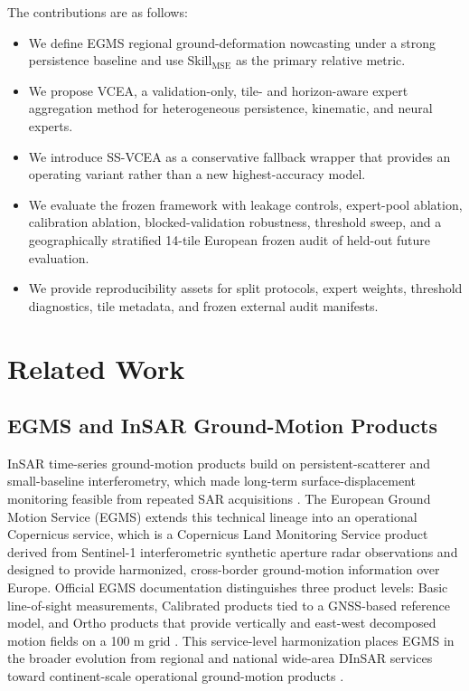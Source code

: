 \documentclass[lettersize,journal]{IEEEtran}
\newcommand{\skillmse}{Skill$_{\mathrm{MSE}}$}
\begin{document}
The contributions are as follows:
\begin{itemize}
  \item We define EGMS regional ground-deformation nowcasting under a strong persistence baseline and use \skillmse{} as the primary relative metric.
  \item We propose VCEA, a validation-only, tile- and horizon-aware expert aggregation method for heterogeneous persistence, kinematic, and neural experts.
  \item We introduce SS-VCEA as a conservative fallback wrapper that provides an operating variant rather than a new highest-accuracy model.
  \item We evaluate the frozen framework with leakage controls, expert-pool ablation, calibration ablation, blocked-validation robustness, threshold sweep, and a geographically stratified 14-tile European frozen audit of held-out future evaluation.
  \item We provide reproducibility assets for split protocols, expert weights, threshold diagnostics, tile metadata, and frozen external audit manifests.
\end{itemize}

\section{Related Work}

\subsection{EGMS and InSAR Ground-Motion Products}

InSAR time-series ground-motion products build on persistent-scatterer and small-baseline interferometry, which made long-term surface-displacement monitoring feasible from repeated SAR acquisitions \cite{Ferretti2001SAR, Berardino2002SAR, Crosetto2016persis}. The European Ground Motion Service (EGMS) extends this technical lineage into an operational Copernicus service, which is a Copernicus Land Monitoring Service product derived from Sentinel-1 interferometric synthetic aperture radar observations and designed to provide harmonized, cross-border ground-motion information over Europe. Official EGMS documentation distinguishes three product levels: Basic line-of-sight measurements, Calibrated products tied to a GNSS-based reference model, and Ortho products that provide vertically and east-west decomposed motion fields on a 100 m grid \cite{egms_product_description,egms_ortho_product,egms_product_description_v3,Crosetto2026EGMS}. This service-level harmonization places EGMS in the broader evolution from regional and national wide-area DInSAR services toward continent-scale operational ground-motion products \cite{crosetto2020evolution}.
\end{document}
